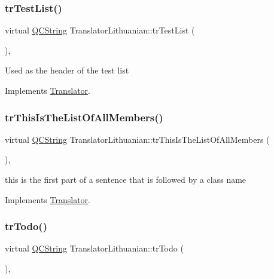 \subsubsection{\texorpdfstring{trTestList()}{trTestList()}}
{\footnotesize\ttfamily virtual \mbox{\hyperlink{class_q_c_string}{Q\+C\+String}} Translator\+Lithuanian\+::tr\+Test\+List (\begin{DoxyParamCaption}{ }\end{DoxyParamCaption})\hspace{0.3cm}{\ttfamily [inline]}, {\ttfamily [virtual]}}

Used as the header of the test list 

Implements \mbox{\hyperlink{class_translator}{Translator}}.

\mbox{\label{class_translator_lithuanian_a376e7df8552c1639614f5bb047319a36}} 
\subsubsection{\texorpdfstring{trThisIsTheListOfAllMembers()}{trThisIsTheListOfAllMembers()}}
{\footnotesize\ttfamily virtual \mbox{\hyperlink{class_q_c_string}{Q\+C\+String}} Translator\+Lithuanian\+::tr\+This\+Is\+The\+List\+Of\+All\+Members (\begin{DoxyParamCaption}{ }\end{DoxyParamCaption})\hspace{0.3cm}{\ttfamily [inline]}, {\ttfamily [virtual]}}

this is the first part of a sentence that is followed by a class name 

Implements \mbox{\hyperlink{class_translator}{Translator}}.

\mbox{\label{class_translator_lithuanian_a44b258f00b3e9d131ea09bbe0f059654}} 
\subsubsection{\texorpdfstring{trTodo()}{trTodo()}}
{\footnotesize\ttfamily virtual \mbox{\hyperlink{class_q_c_string}{Q\+C\+String}} Translator\+Lithuanian\+::tr\+Todo (\begin{DoxyParamCaption}{ }\end{DoxyParamCaption})\hspace{0.3cm}{\ttfamily [inline]}, {\ttfamily [virtual]}}

